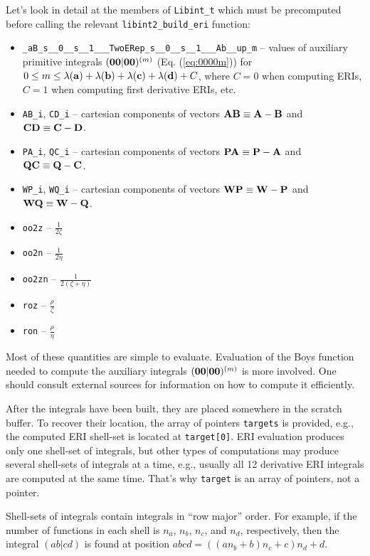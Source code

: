 \documentclass[12pt]{article}
\begin{document}
Let's look in detail at the members of {\tt Libint\_t} which must be precomputed before
calling the relevant {\tt libint2\_build\_eri} function:
\begin{itemize}
\item {\tt \_aB\_s\_\_0\_\_s\_\_1\_\_\_TwoERep\_s\_\_0\_\_s\_\_1\_\_\_Ab\_\_up\_m} --
values of auxiliary primitive integrals $({\bf 00}|{\bf 00})^{(m)}$ (Eq. (\ref{eq:0000m}))
for $0 \leq m \leq \lambda({\bf a}) + \lambda({\bf b}) + \lambda({\bf c}) + \lambda({\bf d}) + C$,
where $C = 0$ when computing ERIs, $C=1$ when computing first derivative ERIs, etc.
\item {\tt AB\_i}, {\tt CD\_i} -- cartesian components of vectors ${\bf AB} \equiv {\bf A} - {\bf B}$
and ${\bf CD} \equiv {\bf C} - {\bf D}$.
\item {\tt PA\_i}, {\tt QC\_i} -- cartesian components of vectors ${\bf PA} \equiv {\bf P} - {\bf A}$
and ${\bf QC} \equiv {\bf Q} - {\bf C}$.
\item {\tt WP\_i}, {\tt WQ\_i} -- cartesian components of vectors ${\bf WP} \equiv {\bf W} - {\bf P}$
and ${\bf WQ} \equiv {\bf W} - {\bf Q}$.
\item {\tt oo2z} -- $\frac{1}{2\zeta}$
\item {\tt oo2n} -- $\frac{1}{2\eta}$
\item {\tt oo2zn} -- $\frac{1}{2(\zeta+\eta)}$
\item {\tt roz} -- $\frac{\rho}{\zeta}$
\item {\tt ron} -- $\frac{\rho}{\eta}$
\end{itemize}
Most of these quantities are simple to evaluate. Evaluation of the Boys function needed to compute
the auxiliary integrals $({\bf 00}|{\bf 00})^{(m)}$ is more involved.
One should consult external sources for information on how
to compute it efficiently.\cite{Gill91,TaylorInterpolation,IshidaFm}

After the integrals have been built, they are placed somewhere in the scratch buffer.
To recover their location, the array of pointers {\tt targets} is provided, e.g.,
the computed ERI shell-set is located at {\tt target[0]}.
ERI evaluation produces only one shell-set of integrals, but other types of computations
may produce several shell-sets of integrals at a time, e.g., usually all 12 derivative
ERI integrals are computed at the same time. That's why {\tt target} is an array of pointers, not a pointer.

Shell-sets of integrals contain integrals in ``row major'' order.\cite{KnuthACP} For example, if
the number of functions in each shell is $n_a$, $n_b$, $n_c$, and $n_d$, respectively,
then the integral $(ab|cd)$ is found at position $abcd = ( (a n_b + b) n_c + c) n_d + d$.
\end{document}

